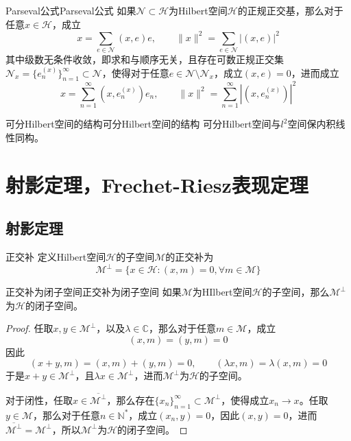 \documentclass[lang = cn, scheme = chinese, thmcnt = section]{elegantbook}
\newcommand{\N}{\mathbb{N}}            %
\newcommand{\C}{\mathbb{C}}  		   %
\newcommand{\sub}{\subset}             %
\begin{document}
\begin{theorem}{Parseval公式}{Parseval公式}
	如果$\mathcal{N}\sub \mathcal{H}$为Hilbert空间$\mathcal{H}$的正规正交基，那么对于任意$x\in \mathcal{H}$，成立
	$$
	x=\sum_{e\in\mathcal{N}}(x,e)e,\qquad
	\|x\|^2=\sum_{e\in\mathcal{N}}|(x,e)|^2
	$$
	其中级数无条件收敛，即求和与顺序无关，且存在可数正规正交集$\mathcal{N}_x=\{ e_n^{(x)} \}_{n=1}^{\infty}\sub\mathcal{N}$，使得对于任意$e\in\mathcal{N}\setminus\mathcal{N}_x$，成立$(x,e)=0$，进而成立
	$$
	x=\sum_{n=1}^\infty(x,e_n^{(x)})e_n,\qquad
	\|x\|^2=\sum_{n=1}^\infty|(x,e_n^{(x)})|^2
	$$
\end{theorem}

\begin{theorem}{可分Hilbert空间的结构}{可分Hilbert空间的结构}
	可分Hilbert空间与$l^2$空间保内积线性同构。
\end{theorem}

\section{射影定理，Frechet-Riesz表现定理}

\subsection{射影定理}

\begin{definition}{正交补}
	定义Hilbert空间$\mathcal{H}$的子空间$\mathcal{M}$的正交补为
	$$
	\mathcal{M}^\perp=\{ x\in \mathcal{H}:(x,m)=0,\forall m\in\mathcal{M} \}
	$$
\end{definition}

\begin{proposition}{正交补为闭子空间}{正交补为闭子空间}
	如果$\mathcal{M}$为HIlbert空间$\mathcal{H}$的子空间，那么$\mathcal{M}^\perp$为$\mathcal{H}$的闭子空间。
\end{proposition}

\begin{proof}
	任取$x,y\in\mathcal{M}^\perp$，以及$\lambda\in\C$，那么对于任意$m\in \mathcal{M}$，成立
	$$
	(x,m)=(y,m)=0
	$$
	因此
	$$
	(x+y,m)=(x,m)+(y,m)=0,\qquad
	(\lambda x,m)=\lambda(x,m)=0
	$$
	于是$x+y\in \mathcal{M}^\perp$，且$\lambda x\in \mathcal{M}^\perp$，进而$\mathcal{M}^\perp$为$\mathcal{H}$的子空间。
	
	对于闭性，任取$x\in\overline{\mathcal{M}^\perp}$，那么存在$\{x_n\}_{n=1}^{\infty}\sub \mathcal{M}^\perp$，使得成立$x_n\to x$。任取$y\in \mathcal{M}$，那么对于任意$n\in\N^*$，成立$(x_n,y)=0$，因此$(x,y)=0$，进而$\overline{\mathcal{M}^\perp}=\mathcal{M}^\perp$，所以$\mathcal{M}^\perp$为$\mathcal{H}$的闭子空间。
\end{proof}
\end{document}
